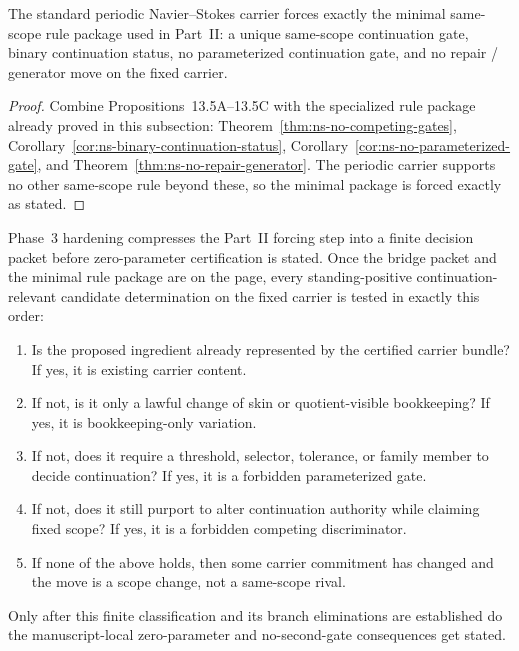\begin{manualcorollary}
\label{cor:13-5D-standard-periodic-carrier-forces-minimal-rule-package}
The standard periodic Navier--Stokes carrier forces exactly the minimal same-scope rule package used
in Part~II: a unique same-scope continuation gate, binary continuation status, no parameterized
continuation gate, and no repair / generator move on the fixed carrier.
\end{manualcorollary}

\begin{proof}
Combine Propositions~13.5A--13.5C with the specialized rule package already proved in this subsection:
Theorem~\ref{thm:ns-no-competing-gates}, Corollary~\ref{cor:ns-binary-continuation-status},
Corollary~\ref{cor:ns-no-parameterized-gate}, and
Theorem~\ref{thm:ns-no-repair-generator}.  The periodic carrier supports no other same-scope rule
beyond these, so the minimal package is forced exactly as stated.
\end{proof}

\begin{tcolorbox}[title={Finite standing-positive same-scope decision procedure on the standard periodic carrier}, colback=blue!2!white, colframe=blue!55!black]
Phase~3 hardening compresses the Part~II forcing step into a finite decision packet before zero-parameter certification is stated. Once the bridge packet and the minimal rule package are on the page, every standing-positive continuation-relevant candidate determination on the fixed carrier is tested in exactly this order:
\begin{enumerate}[leftmargin=2.2em]
\item Is the proposed ingredient already represented by the certified carrier bundle? If yes, it is existing carrier content.
\item If not, is it only a lawful change of skin or quotient-visible bookkeeping? If yes, it is bookkeeping-only variation.
\item If not, does it require a threshold, selector, tolerance, or family member to decide continuation? If yes, it is a forbidden parameterized gate.
\item If not, does it still purport to alter continuation authority while claiming fixed scope? If yes, it is a forbidden competing discriminator.
\item If none of the above holds, then some carrier commitment has changed and the move is a scope change, not a same-scope rival.
\end{enumerate}
Only after this finite classification and its branch eliminations are established do the manuscript-local zero-parameter and no-second-gate consequences get stated.
\end{tcolorbox}

